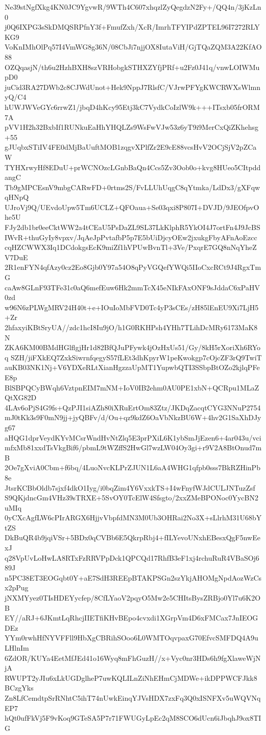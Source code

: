 Ne39stNgfXkg4KN0JC9YgvwR/9WTh4C607xhqzlZyQegdzN2Fy+/QQ4n/3jKzLn0
j0Q6IXPG3sSkDMQSRPfnY3f+FmufZxh/XcR/ImrhTFYIPdZPTEL96I7272RLYKG9
VoKnIMhOlPq57I4VmWG8g36N/08CbJi7njjOX8IutaViH/GjTQaZQM3A22KfAO88
OZQqasjN/th6u2HzhBXH8szVRHobgkSTHXZYfjPRf+u2Fz0J41q/vnwLOIWMupD0
juCid3RA27DWb2c8CJWdUnot+Hek9NppJ7RlsfC/VJrwPFYgKWCRWXsWlmnyQ/C4
hUWJWVeGYc6rrwZ1/jbqD4hKcy95Etj3kC7VydkCoIzlW9k+++ITsxb05frORM7A
pVV1H2h32BxbIf1RUNkuEaHhYHQLZs9WsFwVJw53z6yT9i9MerCxQiZKhehsg+55
gJUqbxSTiIV4FE0dMjBaUuftMOB1zqgvXPlfZr2E9cE88vcsHvV2OCjSjV2pZCaW
TYHXrwyHf8EDuU+prWCNOzcLGnbBaQn4Ccs5Zv3Oob0o+kvg8HUeo5CItpddangC
Tb9gMPCEsnV9mbgCARwFD+0rtms2S/FvLLUhUqgC8qYtmka/LdDx3/gXFqwqHNpQ
UJroVj9Q/UEvdoUpw5Tm6UCLZ+QFOaua+Se03qxi8P807I+DVJD/9JEOfpvOhe5U
FJy2db1br0eeCktWW2a4tCEaU5PsDaZL9SL37LkKlphR5YkOI4J7ortFn4J9JcBS
IWvR+thuGyIy8vpxv/JqAeJpPvtafbP5p7E5bUiDjcyOEw2jxukgFbyAFnAoEzcc
cqHZCWWX3Iq1DCdokgsEcK9miZf1hVPUwBvnTl+3Ve/PxqrE7GQ8nNqYheZV7DuE
2R1enFYN4qfAzy0cz2Eo8Gjb0Y97a54O8qPyVGQefYWQi5IIoCxcRCt9J4RgxTmG
caAw8GLnF93TFe31c0aQ6mefEuw6Hk2mmTcX45eNIkFAxONF9sJddaC6xPaHV0zd
w96N6zPLWgMRV24H40t+e+IOuIoMbFVD0Tc4yP3sCEs/zH85lEnEU9Xi7LjH5+Zr
2hfaxyiKBtSryUA//zdc1hcI8Iu9jO/h1G0RKHPsh4YHh7TLihDcMRy6173MaK8N
ZKA6KM00BMdHGlflgjHr1d82BfQJuPFywk4jOzHxUs51/Gy/8kH5rXoriXh6RYoq
SZH/jiFXkEQ7ZxkSiwrnfqegyS57fLEt3dhKpyrW1peKwokgp7cOjcZF3rQ9TwiT
auKB03NK1Nj+V6YDXeRLtXianHgzzaUpMT1YupwbQTI3SSbpBtOZo2kjlqPFeE8p
BlSBPQCyBWqh6VztpnEIM7mNM+IoV0IB2ehm0AU0PE1xbN+QCRpu1MLaZQtXG82D
4LAv6oPjS4G9fs+QzPJI1siAZh80iXRuErtOm83Ztz/JKDqZacqtCYG3NNuP2754
mJ0tKk3s9F0mN9jj+jyQBFv/d/Ou+qz9kdZ6OaVbNkzBU6W+4hv2G1SaXhDJyg67
aHQG1dprVeydKYvMCsrWndHvNtZlq5E3prPXiL6K1ybSmJjEzen6+4ar043u/vci
mfxMb81xxdTsVkgBif6/pbmL9tWZffS2HwGl7wzLW04Oy3gi+r9V2A8BtOnud7mB
2Oe7gXviA0Cbm+f6bq/4LuoNvcKLPrZJUN1L6aA4WHG1qfpb0sss7BkRZHinPb8e
JtsrKCBbOldb7sjxf4dkO1Iyg/i0bqZim4Y6VxxkTS+I4wFnyfWJdCULJNTuzZsf
S9QKjdncGm4VHz39sTRXE+5SvOY0TcElW4Sfsgto/2xxZMeBPONoc0YycBN2uMIq
0yCXcAgfLW6cPIrARGX6HjjvVbpfdMN3M0Ub3OHRai2No3X+sLlrhM31U68bYtZS
DkBuQR4b9jqiVSr+5BDx0qCVBb6E5QkrpRbj4+fILYevoUNxhEBesxQgF5nwEexJ
q28VpUvLoHwLA8RTxFzRRVPpDck1QPCQd17RhfB3eF1xj4rchuRuR4VBaSOj689J
n5PC38ET3EOGqbt0Y+aE7SdH3REEpBTAKPSGn2szYkjAHOMgNpdAozWzCsx2pPug
jNXMYyez0TIsHDEYycfep/8CfLYaoV2pqyO5Mw2e5CHItsBysZRBjo0Yl7u6K2OB
EY//aRJ+6JKmtLqRhcjIIETfiKHvBEpo4cvxdi1XGrpVm4D6xFMCax7JnIEOGDEz
YYm0rwhHfNYVFFll9HbXgCBRihSOoo6L0WMTOqvpaxG70EfvcSMFDQ4A9uLHlnIm
6ZdOR/KUYa4EetMfJEd41o16Wyq8mFhGuzH//x+Vyc0nr3HDs6h9fgXlaweWjNjA
RWUPT2yJIu6xLkUGDglheP7uwKQLILnZiNhEHmCjMDWe+ikDPPWCFJkk8BCzgYks
Zn8LfCemdtpSrRNhtC5ihT74nUwkEinqYJVsHDX7zxFq3Q0xISNFXv5uWQVNqEP7
hQt0ufFkVj5F9vKoq9GTeSA5P7r71FWUGyLpEc2qM8SCO6dUcn6iJbqhJ9ox8TIG
